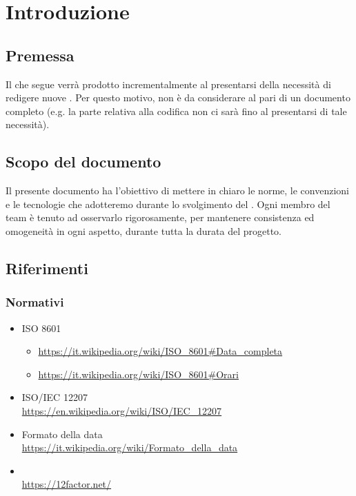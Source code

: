 \section{Introduzione}

    

    \subsection{Premessa}
    Il  che segue verrà prodotto incrementalmente al presentarsi della necessità di redigere nuove .
    Per questo motivo, non è da considerare al pari di un documento completo (e.g. la parte relativa alla codifica non ci sarà fino
    al presentarsi di tale necessità).

    \subsection{Scopo del documento}
    Il presente documento ha l’obiettivo di mettere in chiaro le norme, le convenzioni e le tecnologie che adotteremo durante lo svolgimento del .
    Ogni membro del team \`e tenuto ad osservarlo rigorosamente, per mantenere consistenza ed omogeneit\`a in ogni aspetto, durante tutta la durata del progetto.

    


\subsection{Riferimenti}

    \subsubsection{Normativi}	\label{rifnorma}
    \begin{itemize}
        \item ISO 8601 
        \begin{itemize}
            \item \url{https://it.wikipedia.org/wiki/ISO\_8601#Data_completa}
            \item \url{https://it.wikipedia.org/wiki/ISO\_8601#Orari}
        \end{itemize}
    	\item ISO/IEC 12207 \\\url{https://en.wikipedia.org/wiki/ISO/IEC_12207}
    	\item Formato della data \\\url{https://it.wikipedia.org/wiki/Formato\_della\_data}
        \item {}\\ %
        \url{https://12factor.net/}
    \end{itemize}

